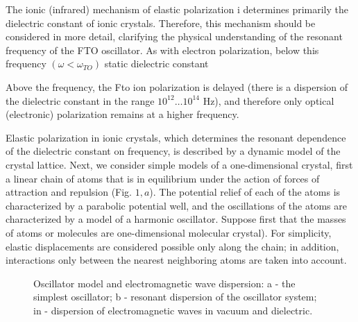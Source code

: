\documentclass[a4paper,14pt]{extreport}
\begin{document}
The ionic (infrared) mechanism of elastic polarization i determines primarily the dielectric constant of ionic crystals. Therefore, this mechanism should be considered in more detail, clarifying the physical understanding of the resonant frequency of the FTO oscillator. As with electron polarization, below this frequency $ \left (\omega <\omega_{T O} \right) $ static dielectric constant

Above the frequency, the Fto ion polarization is delayed (there is a dispersion of the dielectric constant in the range $ 10^{12} \ldots 10^{14} $ Hz), and therefore only optical (electronic) polarization remains at a higher frequency.

Elastic polarization in ionic crystals, which determines the resonant dependence of the dielectric constant on frequency, is described by a dynamic model of the crystal lattice. Next, we consider simple models of a one-dimensional crystal, first a linear chain of atoms that is in equilibrium under the action of forces of attraction and repulsion (Fig. $ 1, a $). The potential relief of each of the atoms is characterized by a parabolic potential well, and the oscillations of the atoms are characterized by a model of a harmonic oscillator. Suppose first that the masses of atoms or molecules are one-dimensional
molecular crystal). For simplicity, elastic displacements are considered
possible only along the chain; in addition, interactions only between the nearest neighboring atoms are taken into account.

\begin{figure}[h]
\caption{Oscillator model and electromagnetic wave dispersion:
a - the simplest oscillator; b - resonant dispersion of the oscillator system;
in - dispersion of electromagnetic waves in vacuum and dielectric.}
\label{ris1}
\end{figure}
\end{document}
